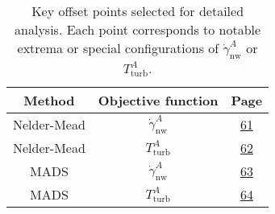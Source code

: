\vspace{7mm}
\begin{table}[H]
	\bgroup
	\centering
	\setlength\tabcolsep{3mm}
	\def\arraystretch{2.2}%
	\begin{tabular}{|c|c|c|}
		\hline
		\textbf{Method} & \textbf{Objective function} & \textbf{Page} \\ \hline
		Nelder-Mead & $\dot{\gamma}^{A}_{\mathrm{nw}}$ &\hyperlink{page.61}{61} \\ \hline
		Nelder-Mead & $T^{A}_{\mathrm{turb}}$ & \hyperlink{page.62}{62} \\ \hline
		MADS & $\dot{\gamma}^{A}_{\mathrm{nw}}$ & \hyperlink{page.63}{63} \\ \hline
		MADS & $T^{A}_{\mathrm{turb}}$ & \hyperlink{page.64}{64} \\ \hline
	\end{tabular}
	\caption{Key offset points selected for detailed analysis. Each point corresponds to notable extrema or special configurations of $\dot{\gamma}^{A}_{\mathrm{nw}}$ or $T^{A}_{\mathrm{turb}}$.}
	\label{tab:optim configs}
	\egroup
\end{table}

\newpage




